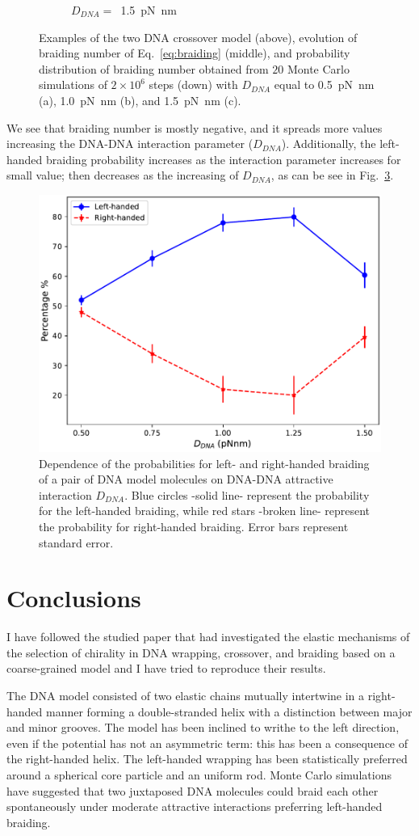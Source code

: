 \documentclass[a4paper,10pt]{article}
\begin{document}
\begin{figure}[tb]
\begin{subfigure}{.3\textwidth}
\caption{$D_{DNA}=$~\SI{1.5}{\pico\newton\nano\meter}}
\label{fig:braD_c}
\end{subfigure}
\caption{Examples of the two DNA crossover model (above), evolution of braiding number of Eq.~\ref{eq:braiding} (middle), and probability distribution of braiding number obtained from $20$ Monte Carlo simulations of $2\times 10^6$ steps (down) with $D_{DNA}$ equal to \SI{0.5}{\pico\newton\nano\meter} (a), \SI{1.0}{\pico\newton\nano\meter} (b), and \SI{1.5}{\pico\newton\nano\meter} (c).}
\label{fig:braD}
\end{figure}

We see that braiding number is mostly negative, and it spreads more values increasing the DNA-DNA interaction parameter ($D_{DNA}$).
Additionally, the left-handed braiding probability increases as the interaction parameter increases for small value; then decreases as the increasing of $D_{DNA}$, as can be see in Fig.~\ref{fig:braD_pr}.

\begin{figure}[tb]
\centering
\includegraphics[width=.5\textwidth]{brD_br_gr.pdf}
\caption{Dependence of the probabilities for left- and right-handed braiding of a pair of DNA model molecules on DNA-DNA attractive interaction $D_{DNA}$.
Blue circles -solid line- represent the probability for the left-handed braiding, while red stars -broken line- represent the probability for right-handed braiding.
Error bars represent standard error.}
\label{fig:braD_pr}
\end{figure}

\section{Conclusions}
I have followed the studied paper that had investigated the elastic mechanisms of the selection of chirality in DNA wrapping, crossover, and braiding based on a coarse-grained model and I have tried to reproduce their results.

The DNA model consisted of two elastic chains mutually intertwine in a right-handed manner forming a double-stranded helix with a distinction between major and minor grooves.
The model has been inclined to writhe to the left direction, even if the potential has not an asymmetric term: this has been a consequence of the right-handed helix.
The left-handed wrapping has been statistically preferred around a spherical core particle and an uniform rod.
Monte Carlo simulations have suggested that two juxtaposed DNA molecules could braid each other spontaneously under moderate attractive interactions preferring left-handed braiding.
\end{document}

